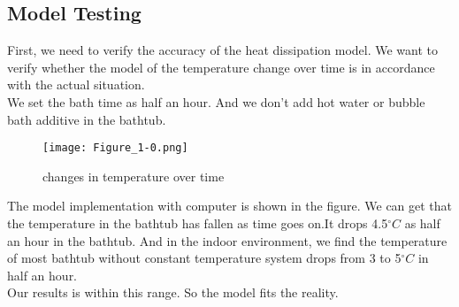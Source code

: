 \documentclass{mcmthesis}
\begin{document}
\subsection{Model Testing}			%
\indent First, we need to verify the accuracy of the heat dissipation model.
We want to verify whether the model of the temperature change over time is in accordance with the actual situation.\\
\indent We set the bath time as half an hour. And we don't add hot water or bubble bath additive in the bathtub. \\
\begin{figure}[H]
\centerline{\texttt{[image: Figure\_1-0.png]}}
\caption{changes in temperature over time}
\label{oval}	
\end{figure}
\indent The model implementation with computer is shown in the figure.
We can get that the temperature in the bathtub has fallen as time goes on.It drops 4.5$^{\circ}C$ as half an hour in the bathtub. And in the indoor environment, we find the temperature of most bathtub without constant temperature system drops from 3 to 5$^{\circ}C$ in half an hour. \\ \indent Our results is within this range. So the model fits the reality.               
\end{document}
